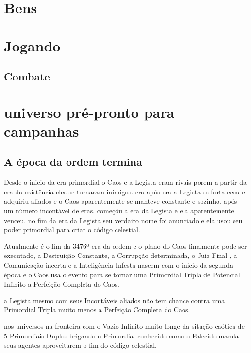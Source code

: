 \part{Bens}
%
%
%
%
\part{Jogando}
\chapter{Combate}
\part{universo pré-pronto para campanhas}
%
%
%
%
\chapter{A época da ordem termina}
Desde o inicio da era primordial o Caos e a Legista eram rivais porem a partir da era da existência eles se tornaram inimigos.
era após era a Legista se fortaleceu e adquiriu aliados e 
o Caos aparentemente se manteve constante e sozinho. 
após um número incontável de eras. começõu a era da Legista e ela aparentemente venceu.
no fim da era da Legista seu verdairo nome foi anunciado e 
ela usou seu poder primordial para criar o código celestial.

Atualmente é o fim da 3476ª era da ordem e o plano do Caos finalmente pode ser executado,
a Destruição Constante, a Corrupção determinada, o Juiz Final , a Comunicação incerta e a Inteligência Infesta 
nascem com o inicio da segunda época e o Caos usa o evento para se tornar uma 
Primordial Tripla de Potencial Infinito a Perfeição Completa do Caos.

a Legista mesmo com seus Incontáveis aliados não tem chance contra uma Primordial Tripla 
muito menos a Perfeição Completa do Caos.

nos universos na fronteira com o Vazio Infinito muito longe da situção caótica de 5 Primordiais Duplos brigando 
o Primordial conhecido como o Falecido manda seus agentes aproveitarem o fim do código celestial.

